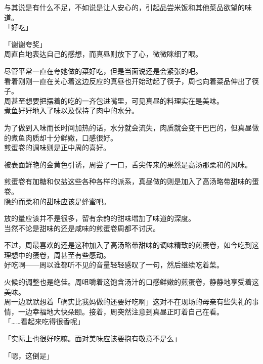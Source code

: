 与其说是有什么不足，不如说是让人安心的，引起品尝米饭和其他菜品欲望的味道。\\

「好吃」

「谢谢夸奖」\\

周直白地表达自己的感想，而真昼则放下了心，微微眯细了眼。

尽管平常一直在夸她做的菜好吃，但是当面说还是会紧张的吧。\\

看着刚刚一直在关心着这边反应的真昼也开始动起了筷子，周也向着菜品伸出了筷子。\\

周甚至想要把摆着的吃的一齐包进嘴里，可见真昼的料理实在是美味。\\

煮鱼好好地入了味以及保持了肉中的水分。

为了做到入味而长时间加热的话，水分就会流失，肉质就会变干巴巴的，但真昼做的煮鱼肉质却十分鲜嫩，口感很好。\\

煎蛋卷的调味则是正中周的喜好。

被表面鲜艳的金黄色引诱，周尝了一口，舌尖传来的果然是高汤那柔和的风味。

煎蛋卷有加糖和仅盐这些各种各样的派系，真昼做的则是加入了高汤略带甜味的蛋卷。\\

隐约而柔和的甜味应该是蜂蜜吧。

放的量应该并不是很多，留有余韵的甜味增加了味道的深度。\\

当然不论是甜味的还是咸味的煎蛋卷周都不讨厌。

不过，周最喜欢的还是这种加入了高汤略带甜味的调味精致的煎蛋卷，如今吃到这理想中的蛋卷，周甚至有些感动。\\

好吃啊——周以谁都听不见的音量轻轻感叹了一句，然后继续吃着菜。

火候的调整也是绝佳。周咀嚼着这饱含汤汁的口感鲜嫩的煎蛋卷，静静地享受着这美味。\\

周一边默默想着「确实比我妈做的还要好吃啊」这对不在现场的母亲有些失礼的事情，一边幸福地大快朵颐。接着，周突然注意到真昼正盯着自己在看。\\

「……看起来吃得很香呢」

「实际上也很好吃嘛。面对美味应该要抱有敬意不是么」

「嗯，这倒是」

